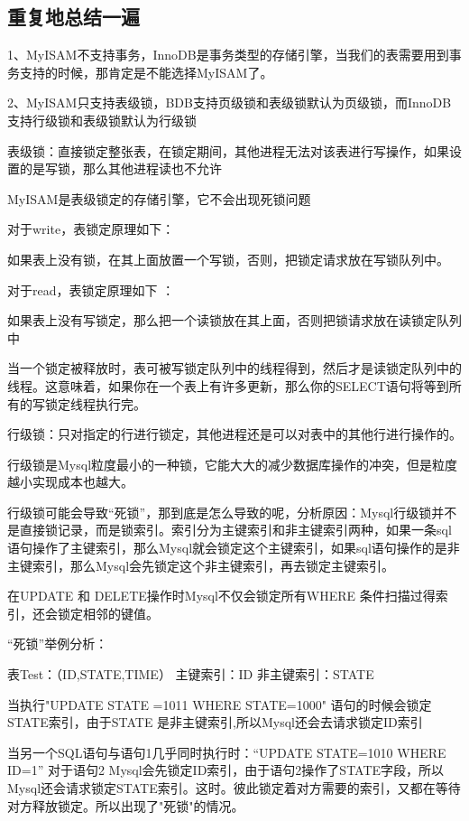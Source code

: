 \documentclass[UTF8]{ctexart}
\begin{document}
 
\subsection{重复地总结一遍}

1、MyISAM不支持事务，InnoDB是事务类型的存储引擎，当我们的表需要用到事务支持的时候，那肯定是不能选择MyISAM了。

2、MyISAM只支持表级锁，BDB支持页级锁和表级锁默认为页级锁，而InnoDB支持行级锁和表级锁默认为行级锁
 
表级锁：直接锁定整张表，在锁定期间，其他进程无法对该表进行写操作，如果设置的是写锁，那么其他进程读也不允许
 
MyISAM是表级锁定的存储引擎，它不会出现死锁问题
 
对于write，表锁定原理如下：
 
如果表上没有锁，在其上面放置一个写锁，否则，把锁定请求放在写锁队列中。
 
对于read，表锁定原理如下 ：
 
如果表上没有写锁定，那么把一个读锁放在其上面，否则把锁请求放在读锁定队列中
 
当一个锁定被释放时，表可被写锁定队列中的线程得到，然后才是读锁定队列中的线程。这意味着，如果你在一个表上有许多更新，那么你的SELECT语句将等到所有的写锁定线程执行完。

行级锁：只对指定的行进行锁定，其他进程还是可以对表中的其他行进行操作的。
 
行级锁是Mysql粒度最小的一种锁，它能大大的减少数据库操作的冲突，但是粒度越小实现成本也越大。
 
行级锁可能会导致“死锁”，那到底是怎么导致的呢，分析原因：Mysql行级锁并不是直接锁记录，而是锁索引。索引分为主键索引和非主键索引两种，如果一条sql语句操作了主键索引，那么Mysql就会锁定这个主键索引，如果sql语句操作的是非主键索引，那么Mysql会先锁定这个非主键索引，再去锁定主键索引。
 
在UPDATE 和 DELETE操作时Mysql不仅会锁定所有WHERE 条件扫描过得索引，还会锁定相邻的键值。
 
“死锁”举例分析：
 
表Test：（ID,STATE,TIME）  主键索引：ID  非主键索引：STATE
 
当执行"UPDATE  STATE =1011 WHERE STATE=1000"  语句的时候会锁定STATE索引，由于STATE 是非主键索引,所以Mysql还会去请求锁定ID索引
 
当另一个SQL语句与语句1几乎同时执行时：“UPDATE STATE=1010 WHERE ID=1”  对于语句2 Mysql会先锁定ID索引，由于语句2操作了STATE字段，所以Mysql还会请求锁定STATE索引。这时。彼此锁定着对方需要的索引，又都在等待对方释放锁定。所以出现了"死锁"的情况。
 
\end{document}
